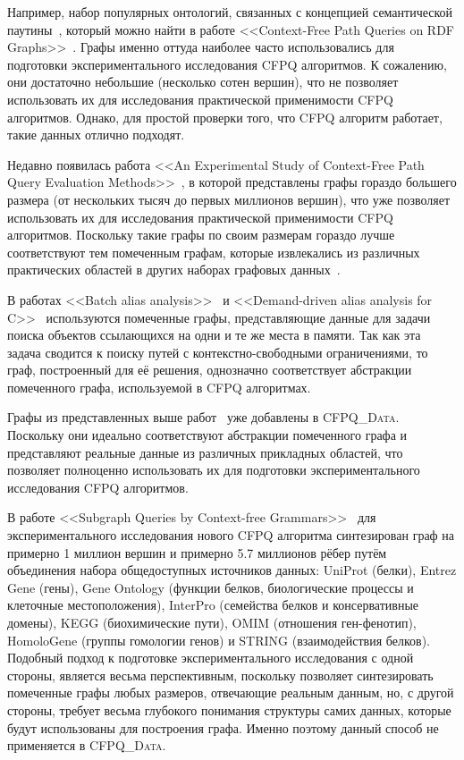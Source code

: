 Например, набор популярных онтологий, связанных с концепцией семантической паутины~\cite{SEMANTICWEB}, который можно найти в работе <<Context-Free Path Queries on RDF Graphs>>~\cite{CFPQORDFG}.
Графы именно оттуда наиболее часто использовались для подготовки экспериментального исследования CFPQ алгоритмов.
К сожалению, они достаточно небольшие (несколько сотен вершин), что не позволяет использовать их для исследования практической применимости CFPQ алгоритмов.
Однако, для простой проверки того, что CFPQ алгоритм работает, такие данных отлично подходят. 

Недавно появилась работа <<An Experimental Study of Context-Free Path Query Evaluation Methods>>~\cite{ANESOFCFPQEM}, в которой представлены графы гораздо большего размера (от нескольких тысяч до первых миллионов вершин), что уже позволяет использовать их для исследования практической применимости CFPQ алгоритмов.
Поскольку такие графы по своим размерам гораздо лучше соответствуют тем помеченным графам, которые извлекались из различных практических областей в других наборах графовых данных~\cite{BoVWFI, BRSLLP, SNAPDATESETS}.

 В работах <<Batch alias analysis>>~\cite{BAA} и <<Demand-driven alias analysis for C>>~\cite{DDAAFORC} используются помеченные графы, представляющие данные для задачи поиска объектов ссылающихся на одни и те же места в памяти.
 Так как эта задача сводится к поиску путей с кон\-текст\-но-свобод\-ными ограничениями, то граф, построенный для её решения, однозначно соответствует абстракции помеченного графа, используемой в CFPQ алгоритмах.

Графы из представленных выше работ~\cite{CFPQORDFG, ANESOFCFPQEM, BAA, DDAAFORC} уже добавлены в \textsc{CFPQ\_Data}.
Поскольку они идеально соответствуют абстракции помеченного графа и представляют реальные данные из различных прикладных областей, что позволяет полноценно использовать их для подготовки экспериментального исследования CFPQ алгоритмов.

В работе <<Subgraph Queries by Context-free Grammars>>~\cite{SQBYCFG} для экспериментального исследования нового CFPQ алгоритма синтезирован граф на примерно 1 миллион вершин и примерно 5.7 миллионов рёбер путём объединения набора общедоступных источников данных: UniProt (белки), Entrez Gene (гены), Gene Ontology (функции белков, биологические процессы и клеточные местоположения), InterPro (семейства белков и консервативные домены), KEGG (биохимические пути), OMIM (отношения ген-фенотип), HomoloGene (группы гомологии генов) и STRING (взаимодействия белков).
Подобный подход к подготовке экспериментального исследования с одной стороны, является весьма перспективным, поскольку позволяет синтезировать помеченные графы любых размеров, отвечающие реальным данным, но, с другой стороны, требует весьма глубокого понимания структуры самих данных, которые будут использованы для построения графа.
Именно поэтому данный способ не применяется в \textsc{CFPQ\_Data}.

